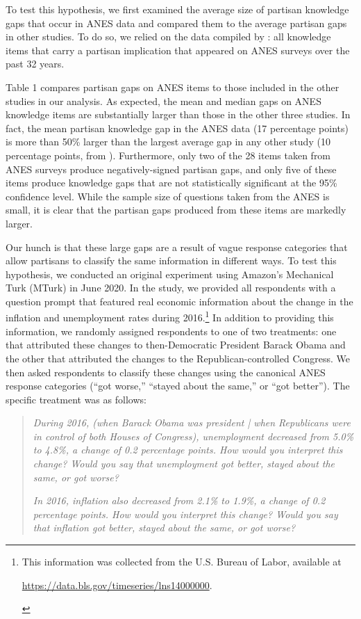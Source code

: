 \documentclass[12pt, letterpaper]{article}
\begin{document}
To test this hypothesis, we first examined the average size of partisan knowledge gaps that occur in ANES data and compared them to the average partisan gaps in other studies. To do so, we relied on the data compiled by \citet{roush_2021}: all knowledge items that carry a partisan implication that appeared on ANES surveys over the past 32 years.

Table 1 compares partisan gaps on ANES items to those included in the other studies in our analysis. As expected, the mean and median gaps on ANES knowledge items are substantially larger than those in the other three studies. In fact, the mean partisan knowledge gap in the ANES data (17 percentage points) is more than 50\% larger than the largest average gap in any other study (10 percentage points, from \citet{bullocketal_2015}). Furthermore, only two of the 28 items taken from ANES surveys produce negatively-signed partisan gaps, and only five of these items produce knowledge gaps that are not statistically significant at the 95\% confidence level. While the sample size of questions taken from the ANES is small, it is clear that the partisan gaps produced from these items are markedly larger.



Our hunch is that these large gaps are a result of vague response categories that allow partisans to classify the same information in different ways. To test this hypothesis, we conducted an original experiment using Amazon's Mechanical Turk (MTurk) in June 2020. In the study, we provided all respondents with a question prompt that featured real economic information about the change in the inflation and unemployment rates during 2016.\footnote{This information was collected from the U.S. Bureau of Labor, available at \begin{footnotesize} \url{https://data.bls.gov/timeseries/lns14000000}.\end{footnotesize}} In addition to providing this information, we randomly assigned respondents to one of two treatments: one that attributed these changes to then-Democratic President Barack Obama and the other that attributed the changes to the Republican-controlled Congress. We then asked respondents to classify these changes using the canonical ANES response categories (``got worse,'' ``stayed about the same,'' or ``got better''). The specific treatment was as follows: 

\begin{quotation} 
\noindent \textit{During 2016, (when Barack Obama was president | when Republicans were in control of both Houses of Congress), unemployment decreased from 5.0\% to 4.8\%, a change of 0.2 percentage points. How would you interpret this change? Would you say that unemployment got better, stayed about the same, or got worse?}

\bigskip

\noindent \textit{In 2016, inflation also decreased from 2.1\% to 1.9\%, a change of 0.2 percentage points. How would you interpret this change? Would you say that inflation got better, stayed about the same, or got worse?}

\end{quotation}
\end{document}
